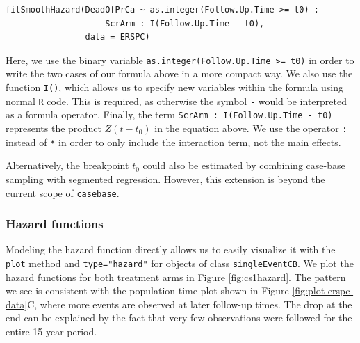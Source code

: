 \begin{verbatim}
fitSmoothHazard(DeadOfPrCa ~ as.integer(Follow.Up.Time >= t0) :
                    ScrArm : I(Follow.Up.Time - t0),
                data = ERSPC)
\end{verbatim}

Here, we use the binary variable \texttt{as.integer(Follow.Up.Time\ \textgreater{}=\ t0)} in order to write the two cases of our formula above in a more compact way. We also use the function \texttt{I()}, which allows us to specify new variables within the formula using normal \texttt{R} code. This is required, as otherwise the symbol \texttt{-} would be interpreted as a formula operator. Finally, the term \texttt{ScrArm\ :\ I(Follow.Up.Time\ -\ t0)} represents the product \(Z (t - t_0)\) in the equation above. We use the operator \texttt{:} instead of \texttt{*} in order to only include the interaction term, not the main effects.

Alternatively, the breakpoint \(t_0\) could also be estimated by combining case-base sampling with segmented regression. However, this extension is beyond the current scope of \texttt{casebase}.

\hypertarget{hazard-functions}{%
\subsubsection{Hazard functions}\label{hazard-functions}}

Modeling the hazard function directly allows us to easily visualize it with
the \texttt{plot} method and \texttt{type="hazard"} for objects of class \texttt{singleEventCB}.
We plot the hazard functions for both treatment arms in Figure \ref{fig:cs1hazard}.
The pattern we see is consistent with the population-time plot shown in Figure \ref{fig:plot-erspc-data}C, where more events are observed at later follow-up times.
The drop at the end can be explained by the fact that very few observations were followed for the entire 15 year period.

